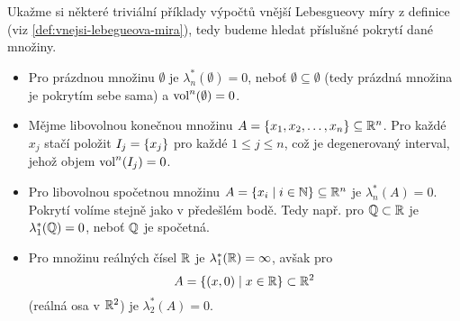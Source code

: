 \begin{example}\label{ex:lebegueova-mira-trivialni-priklady}
    Ukažme si některé triviální příklady výpočtů vnější Lebesgueovy míry z definice (viz \ref{def:vnejsi-lebegueova-mira}), tedy budeme hledat příslušné pokrytí dané množiny.
    \begin{itemize}
        \item Pro prázdnou množinu $\emptyset$ je $\lambda_n^*(\emptyset)=0$, neboť $\emptyset\subseteq\emptyset$ (tedy prázdná množina je pokrytím sebe sama) a $\operatorname{vol}^n(\emptyset)=0$.
        \item Mějme libovolnou konečnou množinu $A=\left\{x_1,x_2,\dots,x_n\right\}\subseteq\mathbb{R}^n$. Pro každé $x_j$ stačí položit $I_j=\left\{x_j\right\}$ pro každé $1\leqslant j\leqslant n$, což je degenerovaný interval, jehož objem $\operatorname{vol}^n(I_j)=0$.
        \item Pro libovolnou spočetnou množinu $A=\left\{x_i\mid i\in\mathbb{N}\right\}\subseteq\mathbb{R}^n$ je $\lambda_n^*(A)=0$. Pokrytí volíme stejně jako v předešlém bodě. Tedy např. pro $\mathbb{Q}\subset\mathbb{R}$ je $\lambda_1^*(\mathbb{Q})=0$, neboť $\mathbb{Q}$ je spočetná.
        \item Pro množinu reálných čísel $\mathbb{R}$ je $\lambda_1^*(\mathbb{R})=\infty$, avšak pro 
        \[A=\left\{(x,0)\mid x\in\mathbb{R}\right\}\subset\mathbb{R}^2\]
        (reálná osa v $\mathbb{R}^2$) je $\lambda_2^*(A)=0$.
    \end{itemize}
\end{example}
